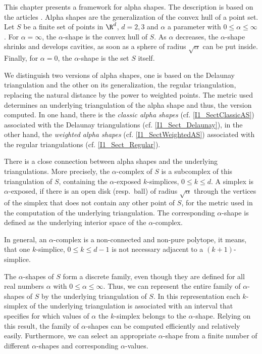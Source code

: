 This chapter presents a framework for alpha shapes. The description is based on
the articles \cite{em-tdas-94,e-was-92}. Alpha shapes are
the generalization of the convex hull of a point set. Let $S$ be a finite set of
points in $\R^d$, $d = 2,3$ and $\alpha$ a parameter with $0 \leq \alpha \leq
\infty$. For $\alpha = \infty$, the $\alpha$-shape is the convex hull of $S$. As 
$\alpha$ decreases, the $\alpha$-shape shrinks and develops cavities, as soon as 
a sphere of radius $\sqrt{\alpha}$ can be put inside.
Finally, for $\alpha = 0$, the $\alpha$-shape is the set $S$ itself.

We distinguish two versions of alpha shapes, one is based on the Delaunay
triangulation and the other on its generalization, the regular triangulation,
replacing the natural distance by the power to weighted points. The metric used
determines an underlying triangulation of the alpha shape and thus, the version
computed. 
In one hand, there is the {\em classic alpha shapes}
(cf. \ref{I1_SectClassicAS}) associated with the Delaunay triangulations
(cf. \ref{I1_Sect_Delaunay}), in the other hand, the {\em weighted alpha shapes}
(cf. \ref{I1_SectWeightedAS}) associated with the regular triangulations
(cf. \ref{I1_Sect_Regular}). 

There is a close connection between alpha shapes and the underlying
triangulations. More precisely, the $\alpha$-complex of $S$ is a
subcomplex of this triangulation of $S$, containing the $\alpha$-exposed
$k$-simplices, $0 \leq k \leq d$. A simplex is $\alpha$-exposed, if there is an
open disk (resp.\ ball) of radius $\sqrt{\alpha}$ through the vertices of the
simplex that does not contain any other point of $S$, for the metric used in
the computation of the underlying triangulation.  The corresponding
$\alpha$-shape is defined as the underlying interior space of the
$\alpha$-complex. 

In general, an $\alpha$-complex is a non-connected and non-pure polytope, it
means, that one $k$-simplice, $0 \leq k \leq d-1$ is not necessary adjacent to
a $(k+1)$-simplice.

The $\alpha$-shapes of $S$ form a discrete family, even though they
are defined for all real numbers $\alpha$ with $0 \leq \alpha
\leq \infty$. Thus, we can represent the entire family of $\alpha$-shapes
of $S$ by the underlying triangulation of $S$. In this representation
each $k$-simplex of the underlying triangulation is associated with an
interval that specifies for which values of $\alpha$ the $k$-simplex
belongs to the $\alpha$-shape. Relying on this result, the family of
$\alpha$-shapes can be computed efficiently and relatively
easily. Furthermore, we can select an appropriate $\alpha$-shape from a
finite number of different $\alpha$-shapes and corresponding
$\alpha$-values.

